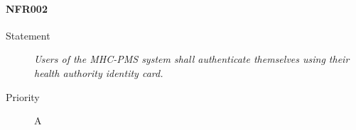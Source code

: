 \paragraph{NFR002}
\begin{description}
  \item [Statement] \textit{Users of the MHC-PMS system shall authenticate
    themselves using their health authority identity card.}
  \item [Priority] A
\end{description}
